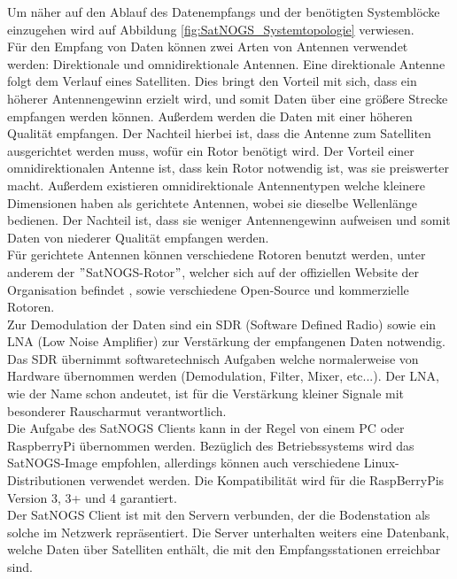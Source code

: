 Um näher auf den Ablauf des Datenempfangs und der benötigten Systemblöcke einzugehen wird auf Abbildung \ref{fig:SatNOGS_Systemtopologie} verwiesen.\\

Für den Empfang von Daten können zwei Arten von Antennen verwendet werden: Direktionale und omnidirektionale Antennen. Eine direktionale Antenne folgt dem Verlauf eines Satelliten. Dies bringt den Vorteil mit sich, dass ein höherer Antennengewinn erzielt wird, und somit Daten über eine größere Strecke empfangen werden können. Außerdem werden die Daten mit einer höheren Qualität empfangen. Der Nachteil hierbei ist, dass die Antenne zum Satelliten ausgerichtet werden muss, wofür ein Rotor benötigt wird. Der Vorteil einer omnidirektionalen Antenne ist, dass kein Rotor notwendig ist, was sie preiswerter macht. Außerdem existieren omnidirektionale Antennentypen welche kleinere Dimensionen haben als gerichtete Antennen, wobei sie dieselbe Wellenlänge bedienen. Der Nachteil ist, dass sie weniger Antennengewinn aufweisen und somit Daten von niederer Qualität empfangen werden.\\

Für gerichtete Antennen können verschiedene Rotoren benutzt werden, unter anderem der $"$SatNOGS-Rotor$"$, welcher sich auf der offiziellen Website der Organisation befindet \cite{SatNOGS-rotor}, sowie verschiedene Open-Source und kommerzielle Rotoren.\\

Zur Demodulation der Daten sind ein SDR (Software Defined Radio) sowie ein LNA (Low Noise Amplifier) zur Verstärkung der empfangenen Daten notwendig. Das SDR übernimmt softwaretechnisch Aufgaben welche normalerweise von Hardware übernommen werden (Demodulation, Filter, Mixer, etc...)\cite{ulversoy_software_2010}. Der LNA, wie der Name schon andeutet, ist für die Verstärkung kleiner Signale mit besonderer Rauscharmut verantwortlich\cite{nguyen_cmos_2004}. \\

Die Aufgabe des SatNOGS Clients kann in der Regel von einem PC oder RaspberryPi übernommen werden. Bezüglich des Betriebssystems wird das SatNOGS-Image empfohlen, allerdings können auch verschiedene Linux-Distributionen verwendet werden. Die Kompatibilität wird für die RaspBerryPis Version 3, 3+ und 4 garantiert\cite{satnogs-raspberry}.\\

Der SatNOGS Client ist mit den Servern verbunden, der die Bodenstation als solche im Netzwerk repräsentiert. Die Server unterhalten weiters eine Datenbank, welche Daten über Satelliten enthält, die mit den Empfangsstationen erreichbar sind.
\pagebreak